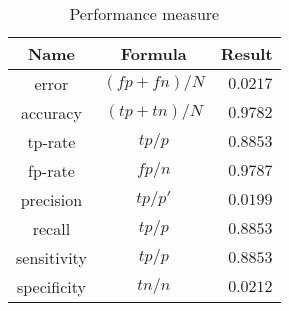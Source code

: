 \begin{table}
    \centering
    \begin{tabular}{|c|c|r|}\hline
    Name        & Formula       &   Result      \\\hline
    error       & $(fp+fn)/N$   &   $0.0217$    \\
    accuracy    & $(tp+tn)/N$   &   $0.9782$    \\\hline
    tp-rate     & $tp/p$        &   $0.8853$    \\
    fp-rate     & $fp/n$        &   $0.9787$    \\\hline
    precision   & $tp/p'$       &   $0.0199$    \\
    recall      & $tp/p$        &   $0.8853$    \\\hline
    sensitivity & $tp/p$        &   $0.8853$    \\
    specificity & $tn/n$        &   $0.0212$    \\\hline
    \end{tabular}
    \caption{Performance measure}
    \label{tab:performance}
\end{table}